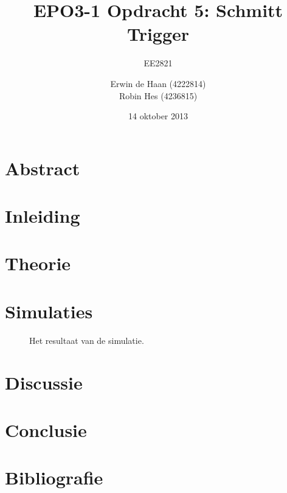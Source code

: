 \documentclass{scrartcl}  %
\author{Erwin {de Haan} (4222814)  \\{Robin Hes} (4236815)}
\title{EPO3-1   Opdracht 5: Schmitt Trigger}
\subtitle{EE2821}
\date{14 oktober 2013}
\begin{document}
\maketitle
\vspace{80 mm}
\section*{Abstract}
\newpage
\setlength{\cftbeforetoctitleskip}{-3em}
\tableofcontents
\newpage
{}
\section{Inleiding}

\section{Theorie}
\section{Simulaties}
\begin{figure}[H]
\centering
	\setlength{} 
	\setlength{}
	
	\caption{Het resultaat van de simulatie.}
	\label{fig:st}
\end{figure}

\section{Discussie}

\section{Conclusie}

\newpage
{}
\section{Bibliografie}
\printbibliography
\end{document}
